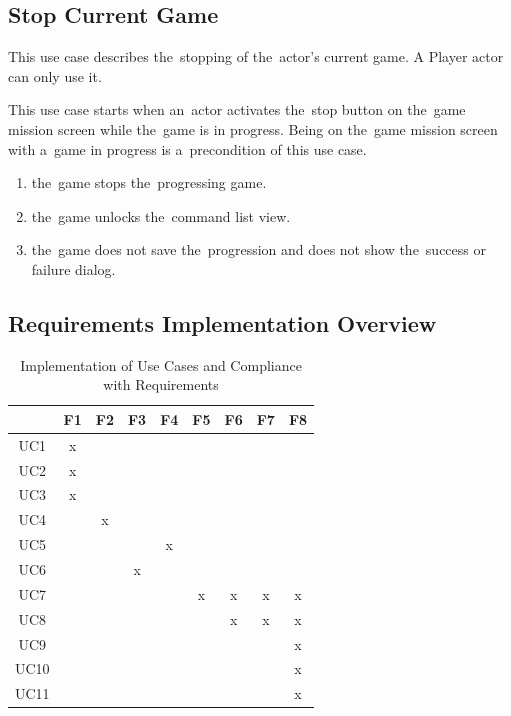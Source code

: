 \subsection{Stop Current Game}

This use case describes the~stopping of the~actor's current game.
A Player actor can only use it.

This use case starts when an~actor activates the~stop button on the~game mission screen while the~game is in progress.
Being on the~game mission screen with a~game in progress is a~precondition of this use case.

\begin{enumerate}
    \item the~game stops the~progressing game.
    \item the~game unlocks the~command list view.
    \item the~game does not save the~progression and does not show the~success or failure dialog. 
\end{enumerate}

\let\thesubsection=\oldsubsection

\subsection{Requirements Implementation Overview}

\begin{table}[]
    \centering
    \begin{tabular}{|c||c|c|c|c|c|c|c|c|}
        \hline
         & F1 & F2 & F3 & F4 & F5 & F6 & F7 & F8  \\\hline\hline
    UC1  & x  &    &    &    &    &    &    &     \\\hline
    UC2  & x  &    &    &    &    &    &    &     \\\hline
    UC3  & x  &    &    &    &    &    &    &     \\\hline
    UC4  &    & x  &    &    &    &    &    &     \\\hline
    UC5  &    &    &    & x  &    &    &    &     \\\hline
    UC6  &    &    & x  &    &    &    &    &     \\\hline
    UC7  &    &    &    &    & x  & x  & x  & x   \\\hline
    UC8  &    &    &    &    &    & x  & x  & x   \\\hline
    UC9  &    &    &    &    &    &    &    & x   \\\hline
    UC10 &    &    &    &    &    &    &    & x   \\\hline
    UC11 &    &    &    &    &    &    &    & x   \\\hline
    \end{tabular}
    \caption{Implementation of Use Cases and Compliance with Requirements}
    \label{table:usecases-requirements}
\end{table}

